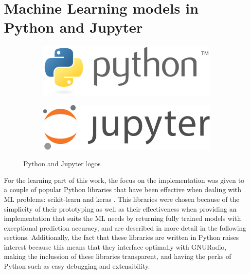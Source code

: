 \section{Machine Learning models in Python and Jupyter}
\begin{figure}[!h]
    \centering
    \begin{subfigure}[htb]{0.45\textwidth}
        \centering
        \includegraphics[width=\linewidth]{figures/python_logo}
        \label{fig:python}
    \end{subfigure}
    \begin{subfigure}[htb]{0.45\textwidth}
        \centering
        \includegraphics[width=\linewidth]{figures/jupyter_logo}
        \label{fig:jupyter}
    \end{subfigure}
    \caption{Python and Jupyter logos}
    \label{fig:python_jupyter}
\end{figure}
For the learning part of this work, the focus on the implementation was given to a couple of popular Python libraries that have been effective when dealing with \ac{ML} problems: scikit-learn \cite{SKLEARN} and keras \cite{KERAS}. This libraries were chosen because of the simplicity of their prototyping as well as their effectiveness when providing an implementation that suits the \ac{ML} needs by returning fully trained models with exceptional prediction accuracy, and are described in more detail in the following sections. Additionally, the fact that these libraries are written in Python raises interest because this means that they interface optimally with GNURadio, making the inclussion of these libraries transparent, and having the perks of Python such as easy debugging and extensibility.\\

